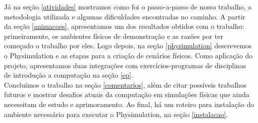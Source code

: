 Já na seção \ref{atividades} mostramos como foi o passo-a-passo de nosso trabalho, a metodologia utilizada e algumas dificuldades encontradas no caminho. A partir da seção \ref{animacoes}, apresentamos um dos resultados obtidos com o trabalho: primeiramente, os ambientes físicos de demonstração e as razões por ter começado o trabalho por eles. Logo depois, na seção \ref{physimulation} descrevemos o Physimulation e as etapas para a criação de cenários físicos. Como aplicação do projeto, apresentamos duas integrações com exercícios-programas de disciplinas de introdução a computação na seção \ref{ep}. \\

Concluímos o trabalho na seção \ref{comentarios}, além de citar possíveis trabalhos futuros e mostrar desafios atuais da computação em simulações físicas que ainda necessitam de estudo e aprimoramento. Ao final, há um roteiro para instalação do ambiente necessário para executar o Physimulation, na seção \ref{instalacao}. 


